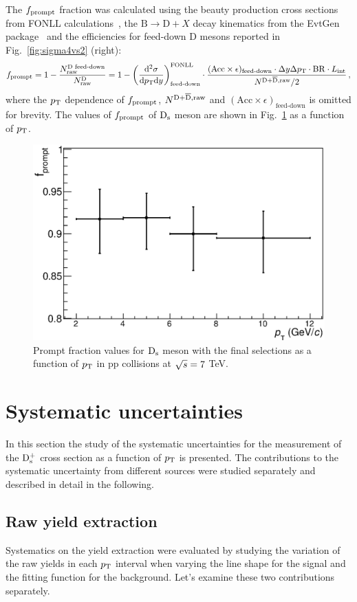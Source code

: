 The $f_{\rm prompt}$ fraction was calculated using the beauty production cross sections from  
FONLL calculations~\cite{Cacciari:1998it, Cacciari:2001td}, the 
$\mathrm{B} \rightarrow \mathrm{D} + X$ decay kinematics from the EvtGen package~\cite{Lange:2001uf} 
and the efficiencies for feed-down D mesons reported in 
Fig.~\ref{fig:sigma4vs2} (right):
\begin{equation}
\label{eq:fpr}
f_{\mathrm{prompt}} =1- \frac{N^{\text{D~feed-down}}_{\mathrm{raw}}}{N^{\mathrm{D}}_{\mathrm{raw}}}= 1- \left (\frac{\rm d^2 \sigma}{\mathrm dp_{\rm T} \mathrm d y} \right)^{\rm FONLL}_{\text{feed-down}} \cdot \frac{(\mathrm{Acc} \times \epsilon)_\text{feed-down} \cdot \Delta y \Delta p_{\rm T} \cdot \mathrm{BR} \cdot L_{\rm int}}{N^{\rm D +\overline{D},raw}/2}\,,
\end{equation}
where the $p_{\rm T}$ dependence of $f_{\rm prompt}$, $N^{\rm D +\overline{D},raw}$ and
$(\mathrm{Acc} \times \epsilon)_\text{feed-down}$ is omitted for brevity.
The values of $f_{\rm prompt}$ of ${\rm D_s}$ meson are shown in Fig.~\ref{fig:fprompt} as a function of $p_{\rm T}$.
\begin{figure}[!hb]
\begin{center}
\includegraphics[width=.48\textwidth]{FigCap4/promptFraction_pass4.eps}
\caption{Prompt fraction values for ${\rm D_s}$ meson with the final selections as a function of $p_{\rm T}$ in pp collisions at $\sqrt{s} = 7$ TeV.}
\label{fig:fprompt}
\end{center}
\end{figure}



\section{Systematic uncertainties}
In this section the study of the systematic uncertainties for the
 measurement of the ${\rm D_s^+}$ cross section as a function of $p_{\rm T}$ is presented. 
 The contributions to the systematic uncertainty from different 
 sources were studied separately and described in detail in the following.

\subsection{Raw yield extraction}
Systematics on the yield extraction were evaluated by studying 
the variation of the raw yields in each $p_{\rm T}$ interval when 
varying the line shape for the signal and the fitting function for the 
background. Let's examine these two contributions separately.\\



